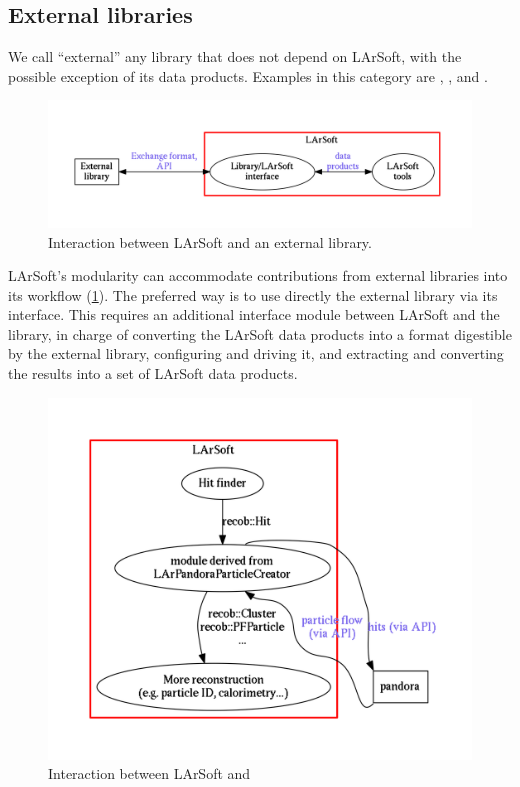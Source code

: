 \subsection{External libraries}\label{external-libraries}

We call ``external'' any library that does not depend on LArSoft, with
the possible exception of its data products. Examples in this category
are \GENIE, \GEANT, and \Pandora.

\begin{figure}
   \centering
   \includegraphics[width=\textwidth]{figures/LArSoftAndExternals}
   \caption{\label{fig:LArSoftAndExternals}
      Interaction between LArSoft and an external library.
   }
\end{figure}

LArSoft's modularity can accommodate contributions from external
libraries into its workflow (\cref{fig:LArSoftAndExternals}). The
preferred way is to use directly the external library via its interface.
This requires an additional interface module between LArSoft and the
library, in charge of converting the LArSoft data products into a format
digestible by the external library, configuring and driving it, and
extracting and converting the results into a set of LArSoft data
products.

\begin{figure}
   \centering
   \includegraphics[width=\textwidth]{figures/LArSoftAndPandora}
   \caption{\label{fig:LArSoftAndPandora}
      Interaction between LArSoft and \Pandora
   }
\end{figure}

